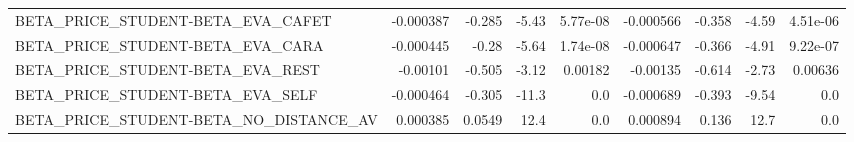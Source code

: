 \begin{tabular}{lrrrrrrrr}
BETA\_PRICE\_STUDENT-BETA\_EVA\_CAFET      &   -0.000387 &       -0.285 &   -5.43 & 5.77e-08 &  -0.000566 &      -0.358 &        -4.59 &      4.51e-06 \\
BETA\_PRICE\_STUDENT-BETA\_EVA\_CARA       &   -0.000445 &        -0.28 &   -5.64 & 1.74e-08 &  -0.000647 &      -0.366 &        -4.91 &      9.22e-07 \\
BETA\_PRICE\_STUDENT-BETA\_EVA\_REST       &    -0.00101 &       -0.505 &   -3.12 &  0.00182 &   -0.00135 &      -0.614 &        -2.73 &       0.00636 \\
BETA\_PRICE\_STUDENT-BETA\_EVA\_SELF       &   -0.000464 &       -0.305 &   -11.3 &      0.0 &  -0.000689 &      -0.393 &        -9.54 &           0.0 \\
BETA\_PRICE\_STUDENT-BETA\_NO\_DISTANCE\_AV &    0.000385 &       0.0549 &    12.4 &      0.0 &   0.000894 &       0.136 &         12.7 &           0.0 \\
\bottomrule
\end{tabular}
